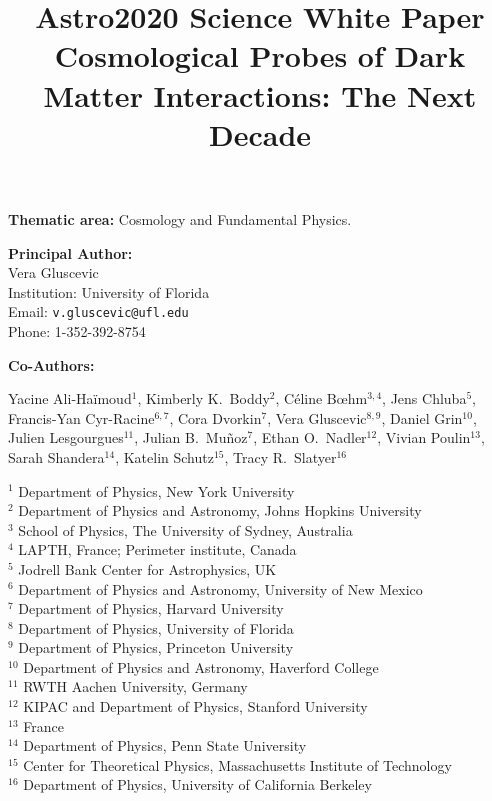 \documentclass[12pt]{article}
\title{{Astro2020 Science White Paper}\\
\vspace{0.5cm}
\bf{Cosmological Probes of Dark Matter Interactions: The Next Decade}}
\date{}
\author{}
\begin{document}
\maketitle
\vspace{-2cm}
\begin{center}
\textbf{Thematic area:} Cosmology and Fundamental Physics.     
\end{center}

\noindent\textbf{Principal Author:} \\
Vera Gluscevic\\
Institution: University of Florida\\
Email: \texttt{v.gluscevic@ufl.edu}\\
Phone: 1-352-392-8754

\vspace{0.5cm}
\noindent\textbf{Co-Authors:}

\noindent 
{Yacine Ali-Ha\"imoud$^{1}$, Kimberly K.~Boddy$^{2}$, C\'eline B\oe{}hm$^{3,4}$, Jens Chluba$^{5}$, Francis-Yan Cyr-Racine$^{6,7}$, Cora Dvorkin$^{7}$, Vera Gluscevic$^{8,9}$, Daniel Grin$^{10}$, Julien Lesgourgues$^{11}$, Julian B.~Mu\~noz$^{7}$, Ethan O.~Nadler$^{12}$, Vivian Poulin$^{13}$, Sarah Shandera$^{14}$, Katelin Schutz$^{15}$, Tracy R.~Slatyer$^{16}$}

\def\affil#1{\noindent #1 \\}

\begin{multicols}{2}
\scriptsize
\affil{$^{1}$ Department of Physics, New York University}
\affil{$^{2}$ Department of Physics and Astronomy, Johns Hopkins University}
\affil{$^{3}$ School of Physics, The University of Sydney, Australia}
\affil{$^{4}$ LAPTH, France; Perimeter institute, Canada}
\affil{$^{5}$ Jodrell Bank Center for Astrophysics, UK}
\affil{$^{6}$ Department of Physics and Astronomy, University of New Mexico}
\affil{$^{7}$ Department of Physics, Harvard University}
\affil{$^{8}$ Department of Physics, University of Florida}
\affil{$^{9}$ Department of Physics, Princeton University}
\affil{$^{10}$ Department of Physics and Astronomy, Haverford College}
\affil{$^{11}$ RWTH Aachen University, Germany}
\affil{$^{12}$ KIPAC and Department of Physics, Stanford University}
\affil{$^{13}$ France}
\affil{$^{14}$ Department of Physics, Penn State University}
\affil{$^{15}$ Center for Theoretical Physics, Massachusetts Institute of Technology}
\affil{$^{16}$ Department of Physics, University of California Berkeley}

\normalsize
\end{multicols}
\end{document}
